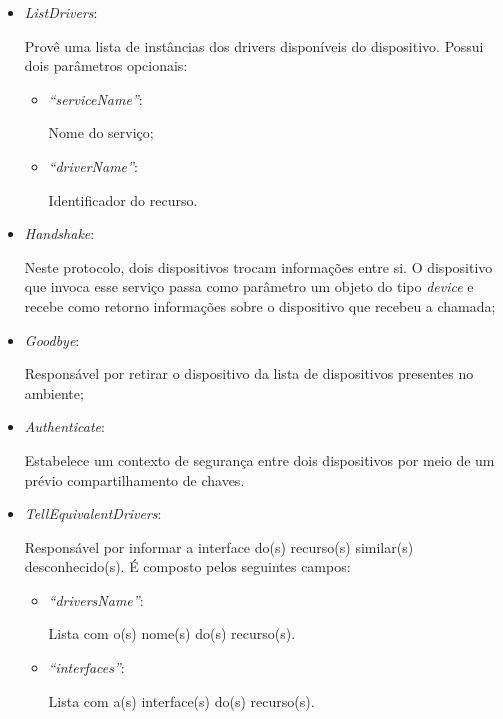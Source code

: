 \begin{itemize}
	\item \emph{ListDrivers}: 

		Provê uma lista de instâncias dos drivers disponíveis do dispositivo. Possui dois parâmetros opcionais:
		\begin{itemize}
			\item \emph{``serviceName''}: 

				Nome do serviço;
			\item \emph{``driverName''}: 

				Identificador do recurso.
		\end{itemize}
	\item \emph{Handshake}: 

		Neste protocolo, dois dispositivos trocam informações entre si. O dispositivo que invoca esse serviço passa como parâmetro um objeto do tipo \emph{device} e recebe como retorno informações sobre o dispositivo que recebeu a chamada;
	\item \emph{Goodbye}: 

		Responsável por retirar o dispositivo da lista de dispositivos presentes no ambiente;
	\item \emph{Authenticate}: 

		Estabelece um contexto de segurança entre dois dispositivos por meio de um prévio compartilhamento de chaves.
	\item \emph{TellEquivalentDrivers}:

		Responsável por informar a interface do(s) recurso(s) similar(s) desconhecido(s). É composto pelos seguintes campos:
		\begin{itemize}
			\item \emph{``driversName''}:

			Lista com o(s) nome(s) do(s) recurso(s).

			\item \emph{``interfaces''}:

			Lista com a(s) interface(s) do(s) recurso(s).
		\end{itemize}
\end{itemize}


\begin{comment}
Serão afetados, ainda, dois protocolos básicos, o \emph{Service Call} e o \emph{Notify}, e o serviço \emph{ListDrivers} dos protocolos \emph{Device Driver} e \emph{Register Driver}. Todos esses serviços contém o parâmetro \emph{driver} que passará a representar uma classe dentre as classes de recursos e não mais o nome do recurso simplesmente.
\end{comment}

